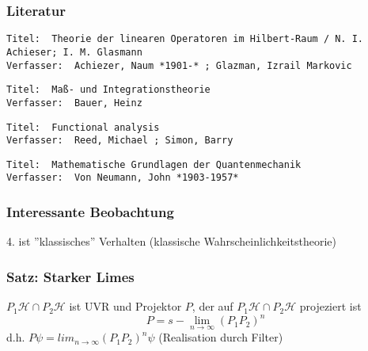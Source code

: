 \documentclass[twoside,a4paper]{scrartcl}
\renewcommand{\1}{\mathds{1}}
\newcommand{\Ra}{\Rightarrow}
\newcommand{\ra}{\rightarrow}
\renewcommand{\H}{\mathcal{H}}
\begin{document}
\subsubsection*{Literatur}
\begin{tiny}
\begin{verbatim}
Titel: 	Theorie der linearen Operatoren im Hilbert-Raum / N. I. Achieser; I. M. Glasmann
Verfasser: 	Achiezer, Naum *1901-* ; Glazman, Izrail Markovic
\end{verbatim}
\begin{verbatim}
Titel:	Maß- und Integrationstheorie
Verfasser:	Bauer, Heinz
\end{verbatim}
\begin{verbatim}
Titel:	Functional analysis
Verfasser:	Reed, Michael ; Simon, Barry
\end{verbatim}
\end{tiny}
\begin{tiny}
\begin{verbatim}
Titel: 	Mathematische Grundlagen der Quantenmechanik
Verfasser: 	Von Neumann, John *1903-1957*
\end{verbatim}
\end{tiny}
\subsubsection*{Interessante Beobachtung}
4. ist ''klassisches'' Verhalten (klassische Wahrscheinlichkeitstheorie)


\subsubsection*{Satz: Starker Limes}
$P_1 \H \cap P_2 \H$ ist UVR und Projektor $P$, der auf $P_1 \H \cap P_2 \H$ projeziert ist
$$P=s-\lim_{n \ra \infty} (P_1P_2)^n$$
d.h. $P\psi=lim_{n \ra \infty} (P_1P_2)^n \psi$ (Realisation durch Filter)
\end{document}
